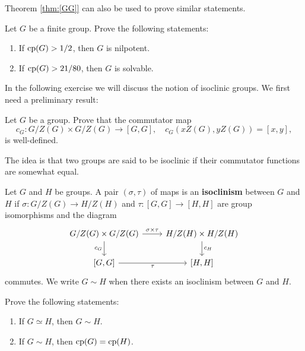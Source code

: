 Theorem \ref{thm:[GG]} 
can also be used to
prove similar statements. 

\begin{exercise}
    \label{xca:cp_NS}
    Let $G$ be a finite group. Prove the following statements:
    \begin{enumerate}
        \item If $\operatorname{cp}(G)>1/2$, then $G$ is nilpotent.
        \item If $\operatorname{cp}(G)>21/80$, then $G$ is solvable. 
    \end{enumerate}
\end{exercise}

In the following exercise we will discuss the notion 
of isoclinic groups. We first need
a preliminary result:

\begin{exercise}
\label{xca:commutator}
    Let $G$ be a group. Prove that the commutator map
    \[
    c_G\colon G/Z(G)\times G/Z(G)\to [G,G],
    \quad
    c_G(xZ(G),yZ(G))=[x,y],
    \]
    is well-defined. 
\end{exercise}

The idea is that two groups are said to be isoclinic 
if their commutator functions are somewhat equal. 

\begin{exercise}
\label{xca:isoclinism}
    \label{xca:isoclinism}
    Let $G$ and $H$ be groups. 
    A pair $(\sigma,\tau)$ of maps is an \textbf{isoclinism}
    between $G$ and $H$ if 
    $\sigma\colon G/Z(G)\to H/Z(H)$ and  
    $\tau\colon [G,G]\to [H,H]$ are group isomorphisms and 
    the diagram
    \begin{equation}
    \label{eq:isoclinism}
    \begin{tikzcd}
	{G/Z(G)\times G/Z(G)} & {H/Z(H)\times H/Z(H)} \\
	{[G,G]} & {[H,H]}
	\arrow["{\sigma\times\tau }", from=1-1, to=1-2]
	\arrow["{c_H}", from=1-2, to=2-2]
	\arrow["{c_G}"', from=1-1, to=2-1]
	\arrow["\tau"', from=2-1, to=2-2]
    \end{tikzcd}
    \end{equation} 
    commutes. We write $G\sim H$ when there exists 
    an isoclinism between $G$ and $H$. 
    
    Prove the following statements:
    \begin{enumerate}
        \item If $G\simeq H$, then $G\sim H$.
        \item If $G\sim H$, then $\operatorname{cp}(G)=\operatorname{cp}(H)$. 
    \end{enumerate}
\end{exercise}

